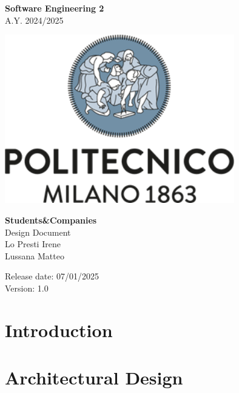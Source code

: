 \documentclass{config/PoliMi3i_thesis}
\numberwithin{algorithm}{chapter}
\begin{document}
%
\fancyhf{} %
\fancyhead[RO,RE]{\thepage} %

\begin{titlepage}

\centering
{\bfseries\LARGE Software Engineering 2\\ 
\vskip0.2cm
}
 \large A.Y. 2024/2025


\vskip1.5cm


\includegraphics[width=10cm]{images/logopoliazzurro.png}\centering
\vskip2cm

     
\centering
{\bfseries \Huge Students\&Companies\\
\vskip0.5cm
}
\huge Design Document\\
\vskip1.5cm
{\Large 
            Lo Presti Irene\\ 
            Lussana Matteo\\
}

\vskip2cm
\raggedright\large{
 Release date: 07/01/2025\\
 Version: 1.0}


\end{titlepage}

\pagebreak

\renewcommand*\contentsname{Table Of Contents}
\tableofcontents

\pagebreak
\chapter{Introduction}


\pagebreak
\chapter{Architectural Design}

\end{document}
